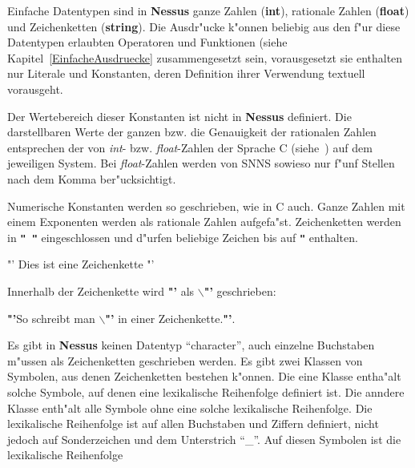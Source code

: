 Einfache Datentypen sind in {\bf Nessus} ganze
Zahlen ({\bf int}), rationale
Zahlen ({\bf float}) und
Zeichenketten ({\bf string}). Die
Ausdr"ucke k"onnen beliebig aus den f"ur diese Datentypen erlaubten
Operatoren und Funktionen (siehe
Kapitel~\ref{EinfacheAusdruecke}
zusammengesetzt sein, vorausgesetzt sie enthalten nur
Literale und Konstanten, deren Definition ihrer Verwendung textuell vorausgeht.

Der Wertebereich dieser
Konstanten ist nicht in {\bf Nessus}
definiert. Die darstellbaren Werte der ganzen bzw. die Genauigkeit der
rationalen Zahlen entsprechen der
von {\it int\/}- bzw. {\it float\/}-Zahlen der Sprache C
(siehe~\cite{ker781}) auf dem jeweiligen System. Bei {\it
float\/}-Zahlen werden von SNNS sowieso nur
f"unf Stellen nach dem Komma ber"ucksichtigt.
 
Numerische Konstanten werden so geschrieben, wie in C auch. Ganze
Zahlen mit einem Exponenten werden als rationale Zahlen aufgefa"st.
\label{Zeichenketten} Zeichenketten  werden in
{\bf \verb&" "&} eingeschlossen und d"urfen beliebige Zeichen bis auf
{\bf \verb&"&} enthalten.

\centerline{"' Dies ist eine Zeichenkette "'}

Innerhalb der Zeichenkette wird {\bf "'} als
{\bf $\backslash$"'} geschrieben: \\

\centerline{ {\bf "'}So schreibt man {\bf $\backslash$"'}
in einer Zeichenkette.{\bf "'}. }

Es gibt in {\bf Nessus} keinen Datentyp ``character'', auch einzelne
Buchstaben m"ussen als Zeichenketten
geschrieben werden. Es gibt zwei Klassen von Symbolen, aus denen
Zeichenketten bestehen k"onnen. Die eine Klasse entha"alt solche
Symbole, auf denen eine lexikalische Reihenfolge definiert ist. Die
anndere Klasse enth"alt alle Symbole ohne eine solche lexikalische
Reihenfolge.  	 Die lexikalische
Reihenfolge ist auf allen Buchstaben und Ziffern definiert, nicht jedoch auf Sonderzeichen
 und dem Unterstrich ``\_''. Auf
diesen Symbolen ist die lexikalische
Reihenfolge

